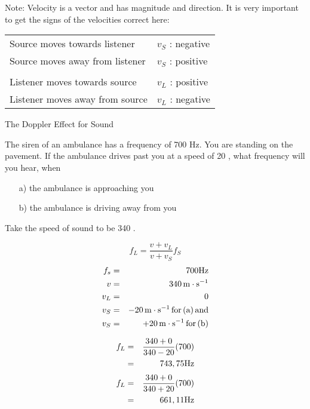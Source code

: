 Note: Velocity is a vector and has magnitude and direction. It is very important to get the signs of the velocities correct here:

\begin{center}
\begin{tabular}{|ll|}
\hline
Source moves towards listener & $v_S$ : negative\\
Source moves away from listener & $v_S$ : positive\\
    &   \\
Listener moves towards source & $v_L$ : positive\\
Listener moves away from source & $v_L$ : negative\\
\hline
\end{tabular}
\end{center}
\begin{wex}{The Doppler Effect for Sound}{
The siren of an ambulance has a frequency of 700 Hz. You are standing on the pavement. If the ambulance drives past you at a speed of 20 \ms, what frequency will you hear, when
\begin{enumerate}
\item[a)] the ambulance is approaching you 
\item[b)] the ambulance is driving away from you
\end{enumerate}
Take the speed of sound to be 340 \ms.
}
{
$$f_L=\frac{v + v_L}{v + v_S}f_S$$
\begin{eqnarray*}
f_s&=&700 \rm{Hz}\\
v&=&340\,\mathrm{m \cdot s^{-1}}\\
v_L&=&0\\
v_S&=&-20\,\mathrm{m \cdot s^{-1}} \rm{\, for\, (a)\, and}\\
v_S&=&+20\,\mathrm{m \cdot s^{-1}} \rm{\, for\, (b)}
\end{eqnarray*}

\begin{eqnarray*}
f_L&=&\frac{340+0}{340-20}(700)\\
&=&743,75 \rm{Hz}
\end{eqnarray*}
\begin{eqnarray*}
f_L&=&\frac{340+0}{340+20}(700)\\
&=&661,11 \rm{Hz}
\end{eqnarray*}
}
\end{wex}


